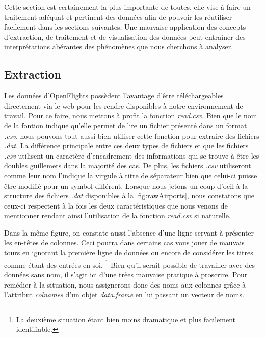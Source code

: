 Cette section est certainement la plus importante de toutes, elle vise à faire un traitement adéquat et pertinent des données afin de pouvoir les réutiliser facilement dans les sections suivantes. Une mauvaise application des concepts d’extraction, de traitement et de visualisation des données peut entraîner des interprétations abérantes des phénomènes que nous cherchons à analyser.

\subsection{Extraction}
Les données d'OpenFlights possèdent l'avantage d'être téléchargeables directement via le web pour les rendre disponibles à notre environnement de travail. Pour ce faire, nous mettons à profit la fonction \emph{read.csv}. Bien que le nom de la fontion indique qu'elle permet de lire un fichier présenté dans un format \emph{.csv}, nous pouvons tout aussi bien utiliser cette fonction pour extraire des fichiers \emph{.dat}. La différence principale entre ces deux types de fichiers et que les fichiers \emph{.csv} utilisent un caractère d'encadrement des informations qui se trouve à être les doubles guillemets dans la majorité des cas. De plus, les fichiers \emph{.csv} utiliseront comme leur nom l'indique la virgule à titre de séparateur bien que celui-ci puisse être modifié pour un symbol différent.\cite{CSVDAT} Lorsque nous jetons un coup d'oeil à la structure des fichiers \emph{.dat} disponibles à la \autoref{fig:rawAirports}, nous constatons que ceux-ci respectent à la fois les deux caractéristiques que nous venons de mentionner rendant ainsi l'utilisation de la fonction \emph{read.csv} si naturelle. 


\noindent
Dans la même figure, on constate aussi l'absence d'une ligne servant à présenter les en-têtes de colonnes. Ceci pourra dans certains cas vous jouer de mauvais tours en ignorant la première ligne de données ou encore de considérer les titres comme étant des entrées en soi. \footnote{La deuxième situation étant bien moins dramatique et plus facilement identifiable.}  Bien qu'il serait possible de travailler avec des données sans nom, il s'agit ici d'une trèes mauvaise pratique à proscrire. Pour remédier à la situation, nous assignerons donc des noms aux colonnes grâce à l'attribut \emph{colnames} d'un objet \emph{data.frame} en lui passant un vecteur de noms.\\

